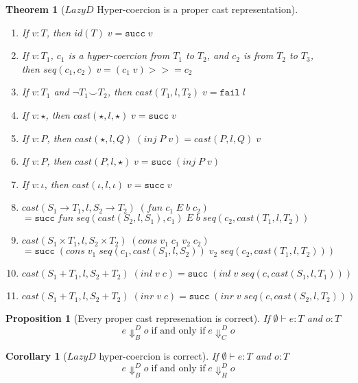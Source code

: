 \documentclass[acmsmall,review,anonymous]{acmart}\settopmatter{printfolios=true,printccs=false,printacmref=false}
\newtheorem{theorem}{Theorem}[]
\newtheorem{proposition}{Proposition}[]
\newtheorem{corollary}{Corollary}[]
\newcommand{\plus}[0]{+}
\newcommand{\judgetype}[3]{#1 \vdash #2 : #3}
\begin{document}
\begin{theorem}[$ Lazy D $ Hyper-coercion is a proper cast representation]
	\  \\
\begin{enumerate}
	\item If $ v : T $, then $ id(T) \; v = \mathtt{succ} \; v $
	\item If $ v : T_1 $,
	$ c_1 $ is a hyper-coercion from $ T_1 $ to $ T_2 $, and 
	$ c_2 $ is from $ T_2 $ to $ T_3 $,\\
	then $ seq(c_1,c_2) \; v = (c_1 \; v) >>= c_2 $
	\item If $ v : T_1 $ and $ \neg T_1 \smile T_2 $,
	then $ cast(T_1, l, T_2) \; v = \mathtt{fail} \; l $
	\item If $ v : \star $, 
	then $ cast(\star,l,\star) \; v = \mathtt{succ} \; v $
	\item If $ v : P $,
	then $ cast(\star,l,Q) \; (inj \; P \; v) = cast(P,l,Q) \; v $
	\item If $ v : P $,
	then $ cast(P,l,\star) \; v = \mathtt{succ} \; (inj \; P \; v) $
	\item If $ v : \iota $,
	then $ cast(\iota,l,\iota) \; v = \mathtt{succ} \; v $
	\item $ cast(S_1 \rightarrow T_1,l,S_2 \rightarrow T_2) \; (fun \; c_1 \; 
	E \; b \; c_2) $ \\
	$ = \mathtt{succ} \; fun \; seq(cast(S_2,l,S_1),c_1) \; E \; b 
	\; seq(c_2,cast(T_1,l,T_2)) $ 
	\item $ cast(S_1 \times T_1,l,S_2 \times T_2) \; (cons \; v_1 \; c_1 \; 
	v_2 \; c_2) $ \\
	$ = \mathtt{succ} \; (cons \; v_1 \; seq(c_1,cast(S_1,l,S_2)) \; v_2 \; 
	seq(c_2,cast(T_1,l,T_2))) $ 
	\item $ cast(S_1 \plus T_1,l,S_2 \plus T_2) \; (inl \; v \; c) = 
	\mathtt{succ} \; (inl \; v \; seq(c,cast(S_1,l,T_1)) ) $ 
	\item $ cast(S_1 \plus T_1,l,S_2 \plus T_2) \; (inr \; v \; c) = 
	\mathtt{succ} \; (inr \; v \; seq(c,cast(S_2,l,T_2)) ) $ 
\end{enumerate}
\end{theorem}

\begin{proposition}[Every proper cast represenation is correct]
	If $ \judgetype{\emptyset}{e}{T} $ and $ o : T $
	\[
	e \Downarrow_{B}^{D} o \; \text{if and only if} \; 
	e \Downarrow_{C}^{D} o
 	\]
\end{proposition}

\begin{corollary}[$ Lazy D $ hyper-coercion is correct]
	If $ \judgetype{\emptyset}{e}{T} $ and $ o : T $
	\[
	e \Downarrow^{D}_{B} o \; \text{if and only if} \; 
	e \Downarrow^{D}_{H} o
	\]
\end{corollary}
\end{document}
